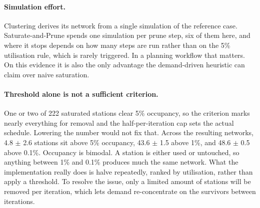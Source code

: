 \paragraph{Simulation effort.} Clustering derives its network from a single simulation of the reference case. Saturate-and-Prune spends one simulation per prune step, six of them here, and where it stops depends on how many steps are run rather than on the 5\% utilisation rule, which is rarely triggered. In a planning workflow that matters. On this evidence it is also the only advantage the demand-driven heuristic can claim over naive saturation.

\paragraph{Threshold alone is not a sufficient criterion.} One or two of 222 saturated stations clear 5\% occupancy, so the criterion marks nearly everything for removal and the half-per-iteration cap sets the actual schedule. Lowering the number would not fix that. Across the resulting networks, 4.8 $\pm$ 2.6 stations sit above 5\% occupancy, 43.6 $\pm$ 1.5 above 1\%, and 48.6 $\pm$ 0.5 above 0.1\%. Occupancy is bimodal. A station is either used or untouched, so anything between 1\% and 0.1\% produces much the same network. What the implementation really does is halve repeatedly, ranked by utilisation, rather than apply a threshold. To resolve the issue, only a limited amount of stations will be removed per iteration, which lets demand re-concentrate on the survivors between iterations. 

